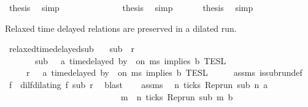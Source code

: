 \begin{isabellebody}
\ {\isacharquery}thesis\ \isamarkupfalse%
\ simp\isanewline
\ \ \ \ \ \ \isamarkupfalse%
\isanewline
\ \ \ \ \isacommand{{\isacharbraceright}}\isamarkupfalse%
\ \isamarkupfalse%
\ {\isacharquery}thesis\ \isamarkupfalse%
\ simp\isanewline
\ \ \isamarkupfalse%
\isanewline
\ \ \isamarkupfalse%
\ {\isacharquery}thesis\ \isamarkupfalse%
\ simp\isanewline
{}\isamarkupfalse%
%
\endisatagproof
{\isafoldproof}%
%
\isadelimproof
%
\endisadelimproof
%
\begin{isamarkuptext}%
Relaxed time delayed relations are preserved in a dilated run.%
\end{isamarkuptext}\isamarkuptrue%
\isamarkupfalse%
\ relaxed{\isacharunderscore}time{\isacharunderscore}delayed{\isacharunderscore}sub{\isacharcolon}\isanewline
\ \ \ {\isacartoucheopen}sub\ {\isasymlless}\ r{\isacartoucheclose}\isanewline
\ \ \ \ \ \ \ {\isacartoucheopen}sub\ {\isasymin}\ {\isasymlbrakk}\ a\ time{\isacharminus}delayed{\isasymbowtie}\ by\ {\isasymdelta}{\isasymtau}\ on\ ms\ implies\ b\ {\isasymrbrakk}\isactrlsub T\isactrlsub E\isactrlsub S\isactrlsub L{\isacartoucheclose}\isanewline
\ \ \ \ \ {\isacartoucheopen}r\ {\isasymin}\ {\isasymlbrakk}\ a\ time{\isacharminus}delayed{\isasymbowtie}\ by\ {\isasymdelta}{\isasymtau}\ on\ ms\ implies\ b\ {\isasymrbrakk}\isactrlsub T\isactrlsub E\isactrlsub S\isactrlsub L{\isacartoucheclose}\isanewline
%
\isadelimproof
%
\endisadelimproof
%
\isatagproof
{}\isamarkupfalse%
\ {\isacharminus}\isanewline
\ \ \isamarkupfalse%
\ assms{\isacharparenleft}{}{\isacharparenright}\ is{\isacharunderscore}subrun{\isacharunderscore}def\ \isamarkupfalse%
\ f\ \ dilf{\isacharcolon}{\isacartoucheopen}dilating\ f\ sub\ r{\isacartoucheclose}\ \isamarkupfalse%
\ blast\isanewline
\ \ \isamarkupfalse%
\ assms{\isacharparenleft}{}{\isacharparenright}\ \isamarkupfalse%
\ {\isacartoucheopen}{\isasymforall}n{\isachardot}\ ticks\ {\isacharparenleft}{\isacharparenleft}Rep{\isacharunderscore}run\ sub{\isacharparenright}\ n\ a{\isacharparenright}\isanewline
\ \ \ \ \ \ \ \ \ \ \ \ \ \ \ \ \ \ \ \ \ \ \ \ \ \ {\isasymlongrightarrow}\ {\isacharparenleft}{\isasymexists}m\ {\isasymge}\ n{\isachardot}\ ticks\ {\isacharparenleft}{\isacharparenleft}Rep{\isacharunderscore}run\ sub{\isacharparenright}\ m\ b{\isacharparenright}\isanewline

\end{isabellebody}
